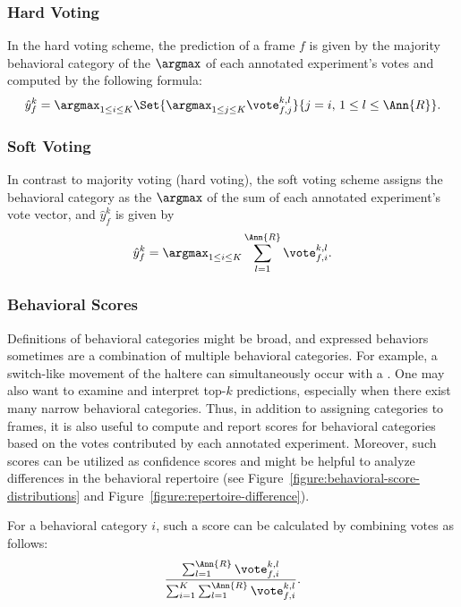 \subsubsection{Hard Voting}
In the hard voting scheme, the prediction of a frame $f$ is given by the majority behavioral category of the $\argmax$ of each annotated experiment's votes and computed by the following formula:
\begin{equation}
	\hat{y}^k_f = \argmax_{1 \leq i \leq K} \Set{\argmax_{1 \leq j \leq K} { \vote_{f,j}^{k,l}}}{j=i, \, 1 \leq l \leq \Ann{R}}.
\end{equation}

\subsubsection{Soft Voting}
In contrast to majority voting (hard voting), the soft voting scheme assigns the behavioral category as the $\argmax$ of the sum of each annotated experiment's vote vector, and $\hat{y}^k_f$ is given by
\begin{equation}
	\hat{y}^k_f = \argmax_{1 \leq i \leq K} \sum_{l=1}^{\Ann{R}} \vote_{f,i}^{k,l}.
\end{equation}

\subsubsection{Behavioral Scores}
Definitions of behavioral categories might be broad, and expressed behaviors sometimes are a combination of multiple behavioral categories.
For example, a switch-like movement of the haltere can simultaneously occur with a \PosturalAdjustment.
One may also want to examine and interpret top-$k$ predictions, especially when there exist many narrow behavioral categories.
Thus, in addition to assigning categories to frames, it is also useful to compute and report scores for behavioral categories based on the votes contributed by each annotated experiment.
Moreover, such scores can be utilized as confidence scores and might be helpful to analyze differences in the behavioral repertoire (see Figure~\ref{figure:behavioral-score-distributions} and Figure~\ref{figure:repertoire-difference}).

For a behavioral category $i$, such a score can be calculated by combining votes as follows:
\begin{equation}
	\frac{\sum_{l=1}^{\Ann{R}} \vote_{f,i}^{k,l}}{\sum_{i = 1}^{K}\sum_{l=1}^{\Ann{R}} \vote_{f,i}^{k,l}}.
\end{equation}

